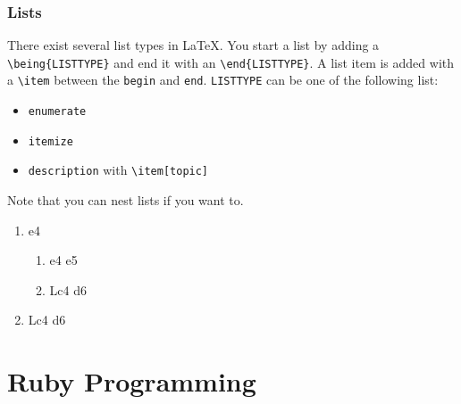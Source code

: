 \documentclass[10pt,a4paper]{scrartcl}
\begin{document}
\subsubsection{Lists}
There exist several list types in \LaTeX. You start a list by adding a 
\verb$\being{LISTTYPE}$ and end it with an \verb$\end{LISTTYPE}$. A list item
is added with a \verb$\item$ between the \texttt{begin} and \texttt{end}.
\texttt{LISTTYPE} can be one of the following list:
\begin{itemize}
	\item \texttt{enumerate}
	\item \texttt{itemize}
	\item \texttt{description} with \verb$\item[topic]$
\end{itemize}
\noindent Note that you can nest lists if you want to.
\begin{enumerate}
	\item{e4} 	
		\begin{enumerate}
			\item{e4}   e5
			\item Lc4 d6
		\end{enumerate}
	\item Lc4 d6
\end{enumerate}


\section{Ruby Programming}
\end{document}
